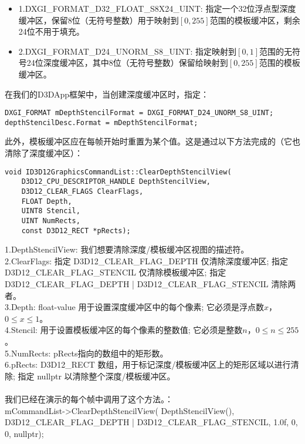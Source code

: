 \begin{itemize}
  \item 1.DXGI\_FORMAT\_D32\_FLOAT\_S8X24\_UINT: 指定一个32位浮点型深度缓冲区，保留8位（无符号整数）用于映射到$[0,255]$范围的模板缓冲区，剩余24位不用于填充。
  \item 2.DXGI\_FORMAT\_D24\_UNORM\_S8\_UINT: 指定映射到$[0,1]$范围的无符号24位深度缓冲区，其中8位（无符号整数）保留给映射到$[0,255]$范围的模板缓冲区。
\end{itemize}

\begin{flushleft}
在我们的D3DApp框架中，当创建深度缓冲区时，指定：\\
\end{flushleft}

\begin{lstlisting}
DXGI_FORMAT mDepthStencilFormat = DXGI_FORMAT_D24_UNORM_S8_UINT;
depthStencilDesc.Format = mDepthStencilFormat;
\end{lstlisting}

\begin{flushleft}
此外，模板缓冲区应在每帧开始时重置为某个值。这是通过以下方法完成的（它也清除了深度缓冲区）：\\
\end{flushleft}

\begin{lstlisting}
void ID3D12GraphicsCommandList::ClearDepthStencilView(
    D3D12_CPU_DESCRIPTOR_HANDLE DepthStencilView,
    D3D12_CLEAR_FLAGS ClearFlags,
    FLOAT Depth,
    UINT8 Stencil,
    UINT NumRects,
    const D3D12_RECT *pRects);
\end{lstlisting}

\begin{flushleft}
1.DepthStencilView: 我们想要清除深度/模板缓冲区视图的描述符。\\

2.ClearFlags: 指定 D3D12\_CLEAR\_FLAG\_DEPTH 仅清除深度缓冲区; 指定 D3D12\_CLEAR\_FLAG\_STENCIL 仅清除模板缓冲区; 指定 D3D12\_CLEAR\_FLAG\_DEPTH | D3D12\_CLEAR\_FLAG\_STENCIL 清除两者。\\

3.Depth: float-value 用于设置深度缓冲区中的每个像素; 它必须是浮点数$x$，$0\leq x\leq 1$。\\

4.Stencil: 用于设置模板缓冲区的每个像素的整数值; 它必须是整数$n$，$0\leq n\leq 255$。\\

5.NumRects: pRects指向的数组中的矩形数。\\

6.pRects: D3D12\_RECT 数组，用于标记深度/模板缓冲区上的矩形区域以进行清除; 指定 nullptr 以清除整个深度/模板缓冲区。\\
~\\
我们已经在演示的每个帧中调用了这个方法。：\\
mCommandList->ClearDepthStencilView(
    DepthStencilView(),
    D3D12_CLEAR_FLAG_DEPTH | D3D12_CLEAR_FLAG_STENCIL,
    1.0f, 0, 0, nullptr);
\end{flushleft}

